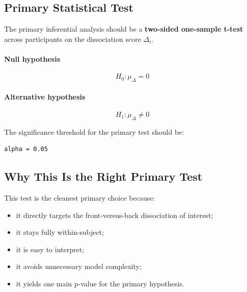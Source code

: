 \documentclass[11pt]{article}
\begin{document}
\subsection{Primary Statistical Test}
The primary inferential analysis should be a \textbf{two-sided one-sample t-test} across participants on
the dissociation score \(\Delta_i\).

\paragraph{Null hypothesis}
\begin{equation}
H_0: \mu_{\Delta} = 0
\end{equation}

\paragraph{Alternative hypothesis}
\begin{equation}
H_1: \mu_{\Delta} \neq 0
\end{equation}

The significance threshold for the primary test should be:
\begin{verbatim}
alpha = 0.05
\end{verbatim}

\subsection{Why This Is the Right Primary Test}
This test is the cleanest primary choice because:
\begin{itemize}
    \item it directly targets the front-versus-back dissociation of interest;
    \item it stays fully within-subject;
    \item it is easy to interpret;
    \item it avoids unnecessary model complexity;
    \item it yields one main p-value for the primary hypothesis.
\end{itemize}
\end{document}

